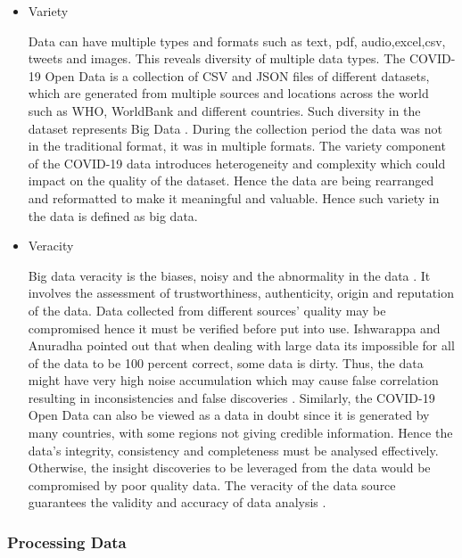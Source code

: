 \documentclass[12pt,letterpaper, twoside]{article}
\begin{document}
\begin{itemize}
    \item Variety
    
    Data can have multiple types and formats such as text, pdf, audio,excel,csv, tweets and images\cite{Johnson et al}. This reveals diversity of multiple data types. The COVID-19 Open Data is a collection of  CSV and JSON files of different datasets, which are generated from multiple sources  and locations across the world such as WHO, WorldBank and different countries. Such diversity in the dataset represents Big Data \cite{Johnson et al}. During the collection period the data was not in the traditional format, it was in multiple formats. The variety component of the COVID-19 data introduces heterogeneity and complexity which could impact on the quality of the dataset.  Hence the data are being rearranged  and reformatted to make it meaningful and valuable. Hence such variety in the data is defined as big data.
    
    \item Veracity
    
    Big data veracity is the biases, noisy and the abnormality in the data \cite{Owais}. It involves the assessment of trustworthiness, authenticity, origin and reputation of the data. Data collected from different sources' quality may be compromised hence it must be verified before put into use. Ishwarappa and Anuradha \cite{Ishwarappa} pointed out that when dealing with large data its impossible for all of the data to be 100 percent correct, some data is dirty. Thus, the data might have very high noise accumulation which may cause false correlation resulting in inconsistencies and false discoveries \cite{Grolinger}.  Similarly, the COVID-19 Open Data can also be viewed as a data in doubt since it is generated by many countries, with some regions not giving credible information. Hence the data’s integrity, consistency and completeness must be analysed effectively. Otherwise, the insight discoveries to be leveraged from the data would be compromised by poor quality data. The veracity of the data source guarantees the validity and accuracy of data analysis \cite{Ishwarappa}.
\end{itemize}

\subsubsection{Processing Data}
\end{document}
